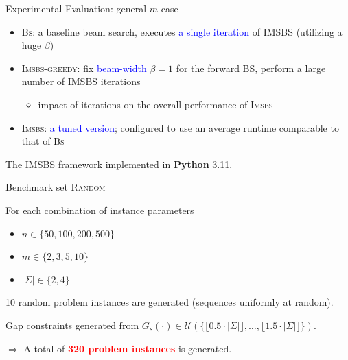 \documentclass{beamer}
\begin{document}
\begin{frame}{Experimental Evaluation: general $m$-case}
	
	\begin{itemize}
		\item \textsc{Bs}: a baseline beam search, executes \textcolor{blue}{a single iteration} of IMSBS (utilizing a huge $\beta$)
 		\vspace{0.3cm}
		\item \textsc{Imsbs-greedy}: fix \textcolor{blue}{beam-width} \( \beta = 1 \) for the forward BS, perform a large number of IMSBS iterations
		\begin{itemize}
			\item impact of iterations on the overall performance of \textsc{Imsbs}
		\end{itemize}
	    \vspace{0.3cm}
		\item \textsc{Imsbs}: \textcolor{blue}{a tuned version};  configured to use an average runtime comparable to that of \textsc{Bs}
	\end{itemize}\vspace{0.5cm}
	
	The IMSBS framework implemented in \textbf{Python} 3.11.
\end{frame}

\begin{frame}{Benchmark set \textsc{Random}}
	 
	 For each combination of instance parameters
	 \begin{itemize}
	 	  \item  $n \in \{50, 100, 200, 500\}$
	 	  \item $m \in \{2, 3, 5, 10\}$
	 	  \item $|\Sigma| \in \{2, 4\}$
	 \end{itemize} 
	 
	 10 random problem instances are generated (sequences uniformly at random). \\ \vspace{0.3cm}
	 
	 Gap constraints generated from $G_{s}(\cdot) \in \mathcal{U}(\{ \lfloor 0.5 \cdot |\Sigma| \rfloor, \ldots, \lfloor 1.5 \cdot |\Sigma| \rfloor \})$.   \\ \vspace{0.7cm}
	 
	 $\Longrightarrow$ A total of \textcolor{red}{\textbf{320 problem instances}} is generated. 
	 
\end{frame}
\end{document}
